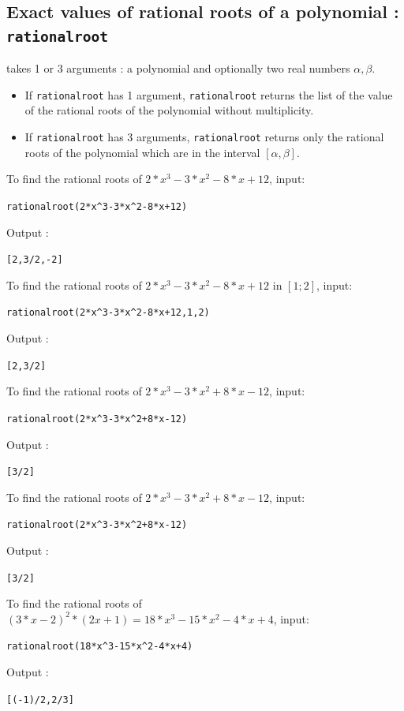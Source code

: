 \documentclass[a4paper,11pt]{book}
\begin{document}
\subsection{Exact values of rational roots of a polynomial : \\
{\tt rationalroot}}
 takes 1 or 3 arguments : a polynomial and  
optionally two real numbers $\alpha,\beta$.
\begin{itemize}
\item If {\tt rationalroot} has 1 argument, {\tt rationalroot} returns the list
of the value of the  rational roots of the polynomial without multiplicity.
\item If {\tt rationalroot} has 3 arguments, {\tt rationalroot} returns only 
the rational roots of the polynomial which are in the interval 
$[\alpha,\beta]$.
\end{itemize}
To find the rational roots of $2*x^3-3*x^2-8*x+12$, input:
\begin{center}{\tt rationalroot(2*x\verb|^|3-3*x\verb|^|2-8*x+12)}\end{center}
Output :
\begin{center}{\tt [2,3/2,-2]}\end{center} 
To find the rational roots of $2*x^3-3*x^2-8*x+12$ in $[1;2]$, input:
\begin{center}{\tt rationalroot(2*x\verb|^|3-3*x\verb|^|2-8*x+12,1,2)}\end{center}
Output :
\begin{center}{\tt [2,3/2]}\end{center} 
To find the rational roots of $2*x^3-3*x^2+8*x-12$, input:
\begin{center}{\tt rationalroot(2*x\verb|^|3-3*x\verb|^|2+8*x-12)}\end{center}
Output :
\begin{center}{\tt [3/2]}\end{center} 
To find the rational roots of $2*x^3-3*x^2+8*x-12$, input:
\begin{center}{\tt rationalroot(2*x\verb|^|3-3*x\verb|^|2+8*x-12)}\end{center}
Output :
\begin{center}{\tt [3/2]}\end{center} 
To find the rational roots of $(3*x-2)^2*(2x+1)=18*x^3-15*x^2-4*x+4$, input:
\begin{center}{\tt rationalroot(18*x\verb|^|3-15*x\verb|^|2-4*x+4)}\end{center}
Output :
\begin{center}{\tt [(-1)/2,2/3]}\end{center} 
\end{document}
